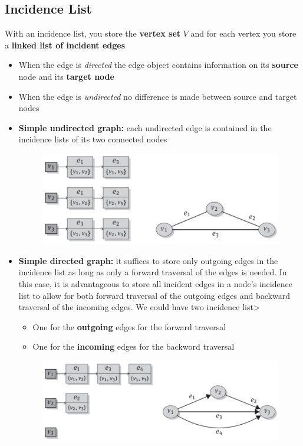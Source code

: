 \subsection{Incidence List}
With an incidence list, you store the \textbf{vertex set} \(V\) and for each vertex you store a \textbf{linked list of incident edges}
\begin{itemize}
    \item When the edge is \textit{directed} the edge object contains information on its \textbf{source} node and its \textbf{target node}
    \item When the edge is \textit{undirected} no difference is made between source and target nodes
\end{itemize}
\begin{itemize}
    \item \textbf{Simple undirected graph:} each undirected edge is contained in the incidence lists of its two connected nodes
    \begin{figure}[!h]
        \centering
        \includegraphics[width=0.7\linewidth]{images/AdvancedDataManagment/graph_databases/inc_list_simple_undirected.jpeg}
        \end{figure}
    
    \item \textbf{Simple directed graph:} it suffices to store only outgoing edges in the incidence list as long as only a forward traversal of the edges is needed. In this case, it is advantageous to store all incident edges in a node’s incidence list to allow for both forward traversal of the outgoing edges and backward traversal of the incoming edges. We could have two incidence list>
    \begin{itemize}
        \item One for the \textbf{outgoing} edges for the forward traversal
        \item One for the \textbf{incoming} edges for the backword traversal
    \end{itemize}
    \begin{figure}[!h]
        \centering
        \includegraphics[width=0.7\linewidth]{images/AdvancedDataManagment/graph_databases/inc_list_simple_directed.jpeg}
        \end{figure}
    

\end{itemize}
